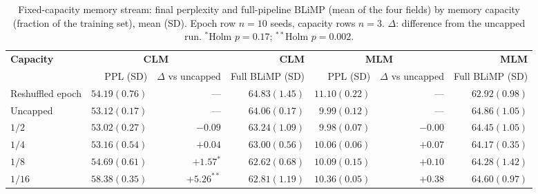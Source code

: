\begin{table}
\centering
\small
\begin{adjustbox}{width=\textwidth}
\begin{tabular}{l|rr|r|rr|r}
\toprule
\textbf{Capacity} & \multicolumn{2}{c|}{\textbf{\textsc{CLM}}} & \textbf{\textsc{CLM}} & \multicolumn{2}{c|}{\textbf{\textsc{MLM}}} & \textbf{\textsc{MLM}} \\
& PPL (SD) & $\Delta$ vs uncapped & Full BLiMP (SD) & PPL (SD) & $\Delta$ vs uncapped & Full BLiMP (SD) \\
\midrule
Reshuffled epoch & $54.19(0.76)$ & — & $64.83(1.45)$ & $11.10(0.22)$ & — & $62.92(0.98)$ \\
Uncapped & $53.12(0.17)$ & — & $64.06(0.17)$ & $9.99(0.12)$ & — & $64.86(1.05)$ \\
$1/2$ & $53.02(0.27)$ & $-0.09$ & $63.24(1.09)$ & $9.98(0.07)$ & $-0.00$ & $64.45(1.05)$ \\
$1/4$ & $53.16(0.54)$ & $+0.04$ & $63.00(0.56)$ & $10.06(0.06)$ & $+0.07$ & $64.17(0.35)$ \\
$1/8$ & $54.69(0.61)$ & $+1.57^*$ & $62.62(0.68)$ & $10.09(0.15)$ & $+0.10$ & $64.28(1.42)$ \\
$1/16$ & $58.38(0.35)$ & $+5.26^{**}$ & $62.81(1.19)$ & $10.36(0.05)$ & $+0.38$ & $64.60(0.97)$ \\
\bottomrule
\end{tabular}
\end{adjustbox}
\caption{Fixed-capacity memory stream: final perplexity and full-pipeline BLiMP (mean of the four fields) by memory capacity (fraction of the training set), mean (SD). Epoch row $n=10$ seeds, capacity rows $n=3$. $\Delta$: difference from the uncapped run. $^*$Holm $p = 0.17$; $^{**}$Holm $p = 0.002$.}
\label{tab:stream-cap-ppl}
\end{table}

